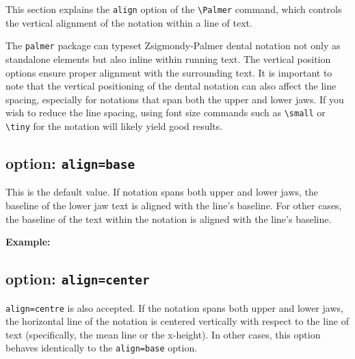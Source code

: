 \documentclass[12pt]{ltjsarticle}
\begin{document}
This section explains the \texttt{align} option of the \verb|\Palmer| command, which controls the vertical alignment of the notation within a line of text.

The \texttt{palmer} package can typeset Zsigmondy-Palmer dental notation not only as standalone elements but also inline within running text. The vertical position options ensure proper alignment with the surrounding text. It is important to note that the vertical positioning of the dental notation can also affect the line spacing, especially for notations that span both the upper and lower jaws. If you wish to reduce the line spacing, using font size commands such as \verb|\small| or \verb|\tiny| for the notation will likely yield good results.



\subsection{option: \texttt{align=base}}

This is the default value. If notation spans both upper and lower jaws, the baseline of the lower jaw text is aligned with the line's baseline. For other cases, the baseline of the text within the notation is aligned with the line's baseline.

\textbf{Example:}

 \noindent

 \noindent

 \subsection{option: \texttt{align=center}}

 \texttt{align=centre} is also accepted. If the notation spans both upper and lower jaws, the horizontal line of the notation is centered vertically with respect to the line of text (specifically, the mean line or the x-height). In other cases, this option behaves identically to the \texttt{align=base} option.
\end{document}
